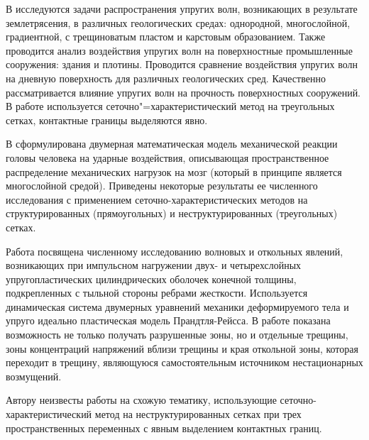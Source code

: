 В \cite{golubev_kvasov_petrov} исследуются задачи распространения упругих волн, возникающих в результате землетрясения, в различных геологических средах: однородной, многослойной, градиентной, с трещиноватым пластом и карстовым образованием. Также проводится анализ воздействия упругих волн на поверхностные промышленные сооружения: здания и плотины. Проводится сравнение воздействия упругих волн на дневную поверхность для различных геологических сред. Качественно рассматривается влияние упругих волн на прочность поверхностных сооружений. В работе используется сеточно"=характеристический метод на треугольных сетках, контактные границы выделяются явно.

В \cite{agapov_belocerkovsky_petrov} сформулирована двумерная математическая модель механической реакции головы человека на ударные воздействия, описывающая пространственное распределение механических нагрузок на мозг (который в принципе является многослойной средой). Приведены некоторые результаты ее численного исследования с применением сеточно-характеристических методов на структурированных (прямоугольных) и неструктурированных (треугольных) сетках.

Работа \cite{petrov} посвящена численному исследованию волновых и откольных явлений, возникающих при импульсном нагружении двух- и четырехслойных упругопластических цилиндрических оболочек конечной толщины, подкрепленных с тыльной стороны ребрами жесткости. Используется динамическая система двумерных уравнений механики деформируемого тела и упруго идеально пластическая модель Прандтля-Рейсса. В работе показана возможность не только получать разрушенные зоны, но и отдельные трещины, зоны концентраций напряжений вблизи трещины и края откольной зоны, которая переходит в трещину, являющуюся самостоятельным источником нестационарных возмущений.

Автору неизвесты работы на схожую тематику, использующие сеточно-характеристический метод на неструктурированных сетках при трех пространственных переменных с явным выделением контактных границ.

